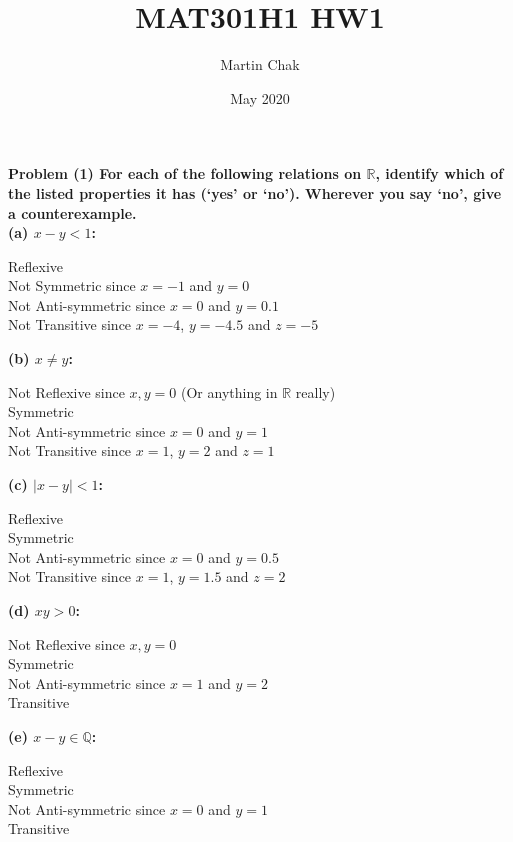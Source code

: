 \documentclass[20pt]{article}
\title{MAT301H1 HW1}
\author{Martin Chak}
\date{May 2020}
\begin{document}
\noindent
\textbf{Problem (1) For each of the following relations on $\mathbb{R}$, identify which of the listed properties
it has (‘yes’ or ‘no’). Wherever you say ‘no’, give a counterexample.}\\
\textbf{(a) $x - y < 1$:}\\
\begin{text}
    \indent Reflexive\\ 
    \indent Not Symmetric since $x = -1$ and $y = 0$\\
    \indent Not Anti-symmetric since $x = 0$ and $y = 0.1$\\
    \indent Not Transitive since $x = -4$, $y = -4.5$ and $z = -5$\\
\end{text}
\textbf{(b) $x \neq y$:}\\
\begin{text}
    \indent Not Reflexive since $x,y = 0$ (Or anything in $\mathbb{R}$ really)\\ 
    \indent Symmetric\\
    \indent Not Anti-symmetric since $x = 0$ and $y = 1$\\
    \indent Not Transitive since $x = 1$, $y = 2$ and $z = 1$\\
\end{text}
\textbf{(c) $|x - y| < 1$:}\\
\begin{text}
    \indent Reflexive\\ 
    \indent Symmetric\\
    \indent Not Anti-symmetric since $x = 0$ and $y = 0.5$\\
    \indent Not Transitive since $x = 1$, $y = 1.5$ and $z = 2$\\
\end{text}
\textbf{(d) $xy > 0$:}\\
\begin{text}
    \indent Not Reflexive since $x,y = 0$\\ 
    \indent Symmetric\\
    \indent Not Anti-symmetric since $x = 1$ and $y = 2$\\
    \indent Transitive\\
\end{text}
\textbf{(e) $x - y \in \mathbb{Q}$:}\\
\begin{text}
    \indent Reflexive\\ 
    \indent Symmetric\\
    \indent Not Anti-symmetric since $x = 0$ and $y = 1$\\
    \indent Transitive\\
\end{text}
\end{document}
